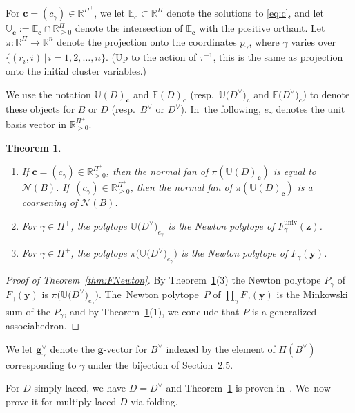 \documentclass[10pt,a4paper]{amsart}
\def\R{{\mathbb R}}
\def\univ{{\operatorname{univ}}}
\def\E{{\mathbb E}}
\def\U{{\mathbb U}}
\def\z{{\mathbf z}}
\def\y{{\mathbf y}}
\def\N{{\mathcal{N}}}
\def\g{{\mathbf g}}
\def\c{{\mathbf c}}
\numberwithin{equation}{section}
\newtheorem{Theorem}{Theorem}[section]
\begin{document}
For $\c=(c_\gamma) \in \R^{\Pi^+}$, we let $\E_\c \subset \R^{\Pi}$ denote the solutions to \eqref{eq:c}, and let $\U_\c := \E_\c \cap \R_{\geq 0}^{\Pi}$ denote the intersection of $\E_\c$ with the positive orthant. Let~$\pi\colon \R^{\Pi} \to \R^n$ denote the projection onto the coordinates $p_\gamma$, where $\gamma$ varies over $\{(r_i,i) \,|\, i=1,2,\dots,n\}$. (Up to the action of $\tau^{-1}$, this is the same as projection onto the initial cluster variables.)

\def\e{{\mathbf e}}
We use the notation $\U(D)_\c$ and $\E(D)_\c$ \big(resp.\ $\U\big(D^\vee\big)_\c$ and $\E\big(D^\vee\big)_\c$\big) to denote these objects for $B$ or $D$ \big(resp.\ $B^\vee$ or $D^\vee$\big). In~the following, $e_\gamma$ denotes the unit basis vector in $\R_{>0}^{\Pi^+}$.

\begin{Theorem}\label{thm:Newt} \
\begin{enumerate}\itemsep=0pt
\item[$1.$]
If $\c=(c_\gamma) \in \R_{>0}^{\Pi^+}$, then the normal fan of $\pi(\U(D)_{\c})$ is equal to $\N(B)$. If~$(c_\gamma) \in \R_{\geq 0}^{\Pi^+}$, then the normal fan of $\pi(\U(D)_{\c})$ is a coarsening of $\N(B)$.
\item[$2.$]
For $\gamma \in \Pi^+$, the polytope $\U\big(D^\vee\big)_{e_\gamma}$ is the Newton polytope of $F^\univ_\gamma(\z)$.
\item[$3.$]
For $\gamma \in \Pi^+$, the polytope $\pi\big(\U\big(D^\vee\big)_{e_\gamma}\big)$ is the Newton polytope of $F_\gamma(\y)$.
\end{enumerate}
\end{Theorem}

\begin{proof}[Proof of Theorem~\ref{thm:FNewton}]
By Theorem~\ref{thm:Newt}(3) the Newton polytope $P_\gamma$ of $F_\gamma(\y)$ is $\pi\big(\U\big(D^\vee\big)_{e_\gamma}\big)$. The~Newton polytope~$P$ of $\prod_\gamma F_\gamma(\y)$ is the Minkowski sum of the $P_\gamma$, and by Theorem~\ref{thm:Newt}(1), we conclude that $P$ is a generalized associahedron.
\end{proof}

We let $\g^\vee_\gamma$ denote the $\g$-vector for $B^\vee$ indexed by the element of $\Pi(B^\vee)$ corresponding to $\gamma$ under the bijection of Section~2.5.

\bigskip{}
For $D$ simply-laced, we have $D = D^\vee$ and Theorem~\ref{thm:Newt} is proven in~\cite{BDMTY}. We~now prove it for multiply-laced $D$ via folding.
\end{document}
